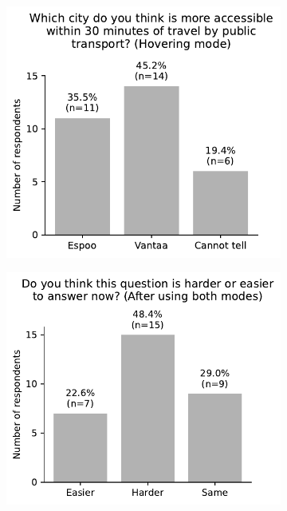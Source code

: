 \begin{appendices}
\begin{figure}[H]
	\begin{subfigure}[b]{0.5\textwidth}
		\includegraphics[width=\textwidth]{visual/figures/survey/3.pdf}
	\end{subfigure}%
	\hfill
	\begin{subfigure}[b]{0.5\textwidth}
		\includegraphics[width=\textwidth]{visual/figures/survey/4.pdf}
	\end{subfigure}%
	\newline
\end{figure}


\end{appendices}
